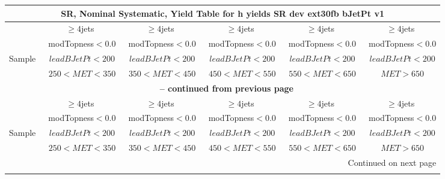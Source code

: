 \documentclass{article}
\begin{document}
\begin{longtable}{|l|c|c|c|c|c|} 
 
\multicolumn{6}{c}{ SR, Nominal Systematic, Yield Table for h yields SR dev ext30fb bJetPt v1 }\\* \hline 
  & $\ge4$jets  & $\ge4$jets  & $\ge4$jets  & $\ge4$jets  & $\ge4$jets \\* 
  & ~modTopness$<0.0$  & ~modTopness$<0.0$  & ~modTopness$<0.0$  & ~modTopness$<0.0$  & ~modTopness$<0.0$ \\* 
Sample  & ~$leadBJetPt<200$  & ~$leadBJetPt<200$  & ~$leadBJetPt<200$  & ~$leadBJetPt<200$  & ~$leadBJetPt<200$ \\* 
  & ~$250<MET<350$  & ~$350<MET<450$  & ~$450<MET<550$  & ~$550<MET<650$  & ~$MET>650$ \\* 
\hline \hline 
\endfirsthead 
 
\multicolumn{6}{c}{{\bfseries \tablename\ \thetable{} -- continued from previous page}}\\* \hline 
  & $\ge4$jets  & $\ge4$jets  & $\ge4$jets  & $\ge4$jets  & $\ge4$jets \\* 
  & ~modTopness$<0.0$  & ~modTopness$<0.0$  & ~modTopness$<0.0$  & ~modTopness$<0.0$  & ~modTopness$<0.0$ \\* 
Sample  & ~$leadBJetPt<200$  & ~$leadBJetPt<200$  & ~$leadBJetPt<200$  & ~$leadBJetPt<200$  & ~$leadBJetPt<200$ \\* 
  & ~$250<MET<350$  & ~$350<MET<450$  & ~$450<MET<550$  & ~$550<MET<650$  & ~$MET>650$ \\* 
\hline \hline 
\endhead 
 
\multicolumn{6}{|r|}{{Continued on next page}}\\* \hline 
\endfoot 
 
 
\endlastfoot 
 

\end{longtable}
\end{document}
